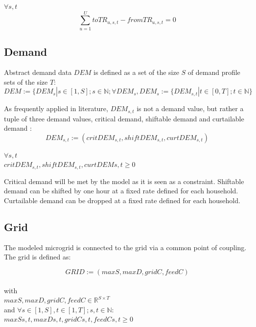 \documentclass[
	11pt,								%
	DIV10,								%
	a4paper,         					%
	oneside,							%
	headheight=20pt,					%
	footheight=20pt,					%
    parskip=full,						%
    listof=totoc,						%
	bibliography=totoc,					%
	index=totoc,						%
]{scrartcl}
\begin{document}
$\forall s,t$
\begin{equation}
	\sum_{u = 1}^{U}{toTR_{u,s,t}-fromTR_{u,s,t}} = 0
\end{equation}





\subsection{Demand}
Abstract demand data $DEM$ is defined as a set of the size $S$ of demand profile sets of the size $T$:
\begin{equation}
 DEM:= \{DEM_s | s \in [1,S]; s\in \mathbb{N}; \forall DEM_s, DEM_s := \{DEM_{s,t} | t\in [0,T]; t \in \mathbb{N}\}
\end{equation}

As frequently applied in literature, $DEM_{s,t}$ is not a demand value, but rather a tuple of three demand values, critical demand, shiftable demand and curtailable demand \cite{silvente2015rolling}\cite{zhang2015optimal}\cite{8216436}\cite{7972908} : 
\begin{equation}
 DEM_{s,t}:= (critDEM_{s,t}, shiftDEM_{s,t}, curtDEM_{s,t}) 
\end{equation}

$\forall s,t$\\
$critDEM_{s,t}, shiftDEM_{s,t}, curtDEM{s,t} \geq 0$

Critical demand will be met by the model as it is seen as a constraint. Shiftable demand can be shifted by one hour at a fixed rate defined for each household. Curtailable demand can be dropped at a fixed rate defined for each household.





\subsection{Grid}
The modeled microgrid is connected to the grid via a common point of coupling. The grid is defined as:

\begin{equation}
	GRID:= (maxS, maxD, gridC, feedC)
\end{equation}\\
with\\
$maxS,maxD, gridC, feedC \in \mathbb{R}^{S \times T}$\\
and $\forall s \in [1,S], t \in [1,T]; s,t \in \mathbb{N}$: \\
$maxS{s,t}, maxD{s,t}, gridC{s,t}, feedC{s,t} \geq 0$
\end{document}
